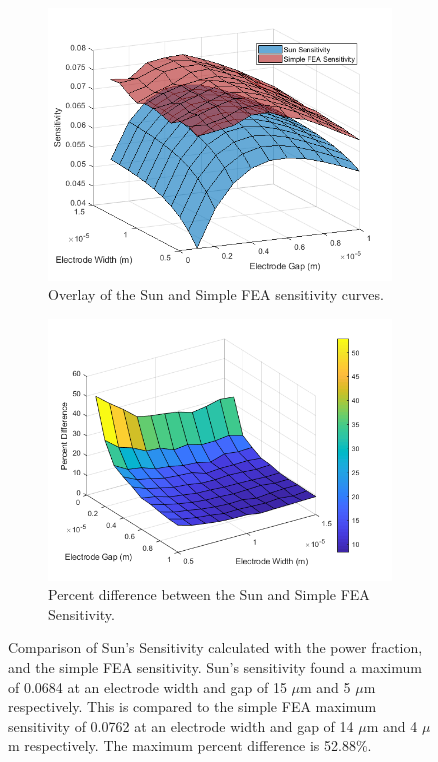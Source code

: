 \begin{figure}[h]
    \centering
    \begin{subfigure}{0.47\textwidth}
        \centering
        \includegraphics[width=\textwidth]{images/SunVsSimpleSensitivity.png}
        \caption{Overlay of the Sun and Simple FEA sensitivity curves.}
    \end{subfigure}
    \hfill
    \begin{subfigure}{0.47\textwidth}
        \centering
        \includegraphics[width=\textwidth]{images/SunVsSimplePercentDiff.png}
        \caption{Percent difference between the Sun and Simple FEA Sensitivity.}
    \end{subfigure}
    \caption{Comparison of Sun's Sensitivity calculated with the power fraction, and the simple FEA sensitivity. Sun's sensitivity found a maximum of 0.0684 at an electrode width and gap of 15 $\mu$m and 5 $\mu$m respectively. This is compared to the simple FEA maximum sensitivity of 0.0762 at an electrode width and gap of 14 $\mu$m and 4 $\mu$m respectively. The maximum percent difference is 52.88\%.}
    \label{fig:sunVsSimpleSensitivity}
\end{figure}

